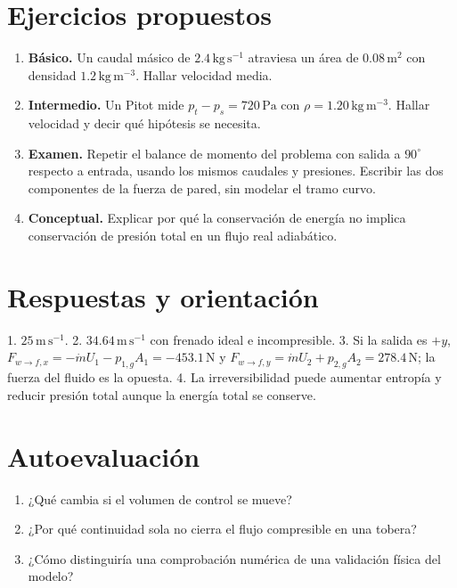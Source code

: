 \section{Ejercicios propuestos}
\begin{enumerate}
\item \textbf{Básico.} Un caudal másico de $2.4\,\mathrm{kg\,s^{-1}}$ atraviesa un área de $0.08\,\mathrm{m^2}$ con densidad $1.2\,\mathrm{kg\,m^{-3}}$. Hallar velocidad media.
\item \textbf{Intermedio.} Un Pitot mide $p_t-p_s=720\,\mathrm{Pa}$ con $\rho=1.20\,\mathrm{kg\,m^{-3}}$. Hallar velocidad y decir qué hipótesis se necesita.
\item \textbf{Examen.} Repetir el balance de momento del problema con salida a $90^\circ$ respecto a entrada, usando los mismos caudales y presiones. Escribir las dos componentes de la fuerza de pared, sin modelar el tramo curvo.
\item \textbf{Conceptual.} Explicar por qué la conservación de energía no implica conservación de presión total en un flujo real adiabático.
\end{enumerate}
\section{Respuestas y orientación}
1. $25\,\mathrm{m\,s^{-1}}$. 2. $34.64\,\mathrm{m\,s^{-1}}$ con frenado ideal e incompresible. 3. Si la salida es $+y$, $F_{w\to f,x}=-\dot mU_1-p_{1,g}A_1=-453.1\,\mathrm{N}$ y $F_{w\to f,y}=\dot mU_2+p_{2,g}A_2=278.4\,\mathrm{N}$; la fuerza del fluido es la opuesta. 4. La irreversibilidad puede aumentar entropía y reducir presión total aunque la energía total se conserve.

\section{Autoevaluación}
\begin{enumerate}
\item ¿Qué cambia si el volumen de control se mueve?
\item ¿Por qué continuidad sola no cierra el flujo compresible en una tobera?
\item ¿Cómo distinguiría una comprobación numérica de una validación física del modelo?
\end{enumerate}
